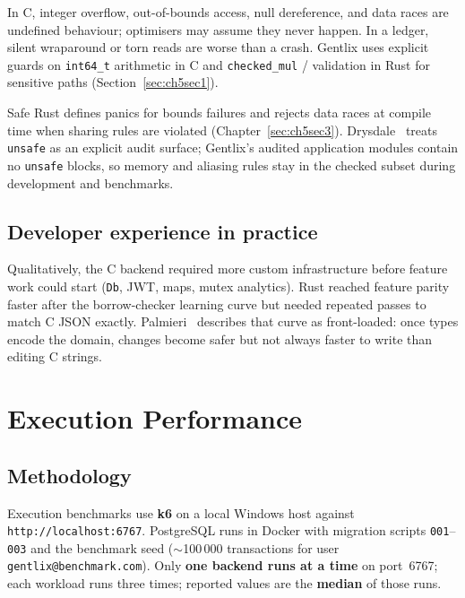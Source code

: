 \par In C, integer overflow, out-of-bounds access, null dereference, and data races are 
undefined behaviour; optimisers may assume they never happen. In a ledger, silent wraparound 
or torn reads are worse than a crash. Gentlix uses explicit guards on \texttt{int64\_t} 
arithmetic in C and \texttt{checked\_mul} / validation in Rust for sensitive paths 
(Section~\ref{sec:ch5sec1}).

\par Safe Rust defines panics for bounds failures and rejects data races at compile time 
when sharing rules are violated (Chapter~\ref{sec:ch5sec3}). Drysdale~\cite{Drysdale2024} 
treats \texttt{unsafe} as an explicit audit surface; Gentlix's audited application modules 
contain no \texttt{unsafe} blocks, so memory and aliasing rules stay in the checked subset 
during development and benchmarks.

\subsection{Developer experience in practice}
\label{subsec:ch8sec1experience}

\par Qualitatively, the C backend required more custom infrastructure before feature work 
could start (\texttt{Db}, JWT, maps, mutex analytics). Rust reached feature parity faster 
after the borrow-checker learning curve but needed repeated passes to match C JSON exactly. 
Palmieri~\cite{Palmieri2022} describes that curve as front-loaded: once types encode the 
domain, changes become safer but not always faster to write than editing C strings.

\section{Execution Performance}
\label{sec:ch8sec2}

\subsection{Methodology}
\label{subsec:ch8sec2method}

\par Execution benchmarks use \textbf{k6} on a local Windows host against 
\texttt{http://localhost:6767}. PostgreSQL runs in Docker with migration scripts 
\texttt{001}--\texttt{003} and the benchmark seed (\(\sim\)100\,000 transactions for user 
\texttt{gentlix@benchmark.com}). Only \textbf{one backend runs at a time} on port~6767; 
each workload runs three times; reported values are the \textbf{median} of those runs.

